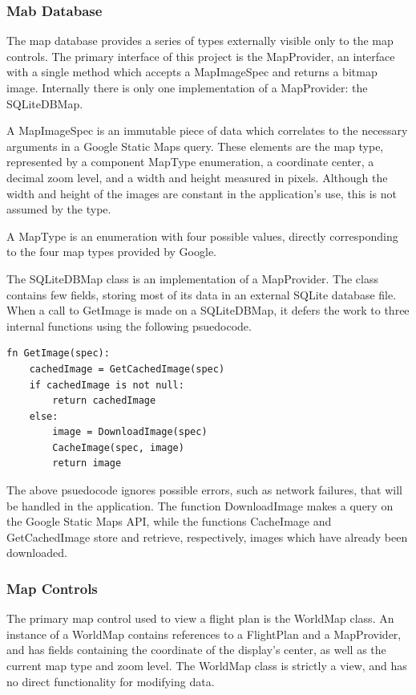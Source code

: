 \documentclass[12pt, letterpaper]{article}
\begin{document}
\newpage
\subsubsection{Mab Database}\label{sec:mapdB}
The map database provides a series of types externally visible only to the map controls.
The primary interface of this project is the MapProvider, an interface with a single method which accepts a MapImageSpec and returns a bitmap image.
Internally there is only one implementation of a MapProvider: the SQLiteDBMap.


A MapImageSpec is an immutable piece of data which correlates to the necessary arguments in a Google Static Maps query.
These elements are the map type, represented by a component MapType enumeration, a coordinate center, a decimal zoom level, and a width and height measured in pixels.
Although the width and height of the images are constant in the application's use, this is not assumed by the type.

A MapType is an enumeration with four possible values, directly corresponding to the four map types provided by Google.

The SQLiteDBMap class is an implementation of a MapProvider.
The class contains few fields, storing most of its data in an external SQLite database file.
When a call to GetImage is made on a SQLiteDBMap, it defers the work to three internal functions using the following psuedocode.

\begin{lstlisting}
fn GetImage(spec):
    cachedImage = GetCachedImage(spec)
    if cachedImage is not null:
        return cachedImage
    else:
        image = DownloadImage(spec)
        CacheImage(spec, image)
        return image
\end{lstlisting}

The above psuedocode ignores possible errors, such as network failures, that will be handled in the application.
The function DownloadImage makes a query on the Google Static Maps API,
while the functions CacheImage and GetCachedImage store and retrieve, respectively, images which have already been downloaded.

\subsubsection{Map Controls}\label{sec:map}
The primary map control used to view a flight plan is the WorldMap class.
An instance of a WorldMap contains references to a FlightPlan and a MapProvider,
and has fields containing the coordinate of the display's center, as well as the current map type and zoom level.
The WorldMap class is strictly a view, and has no direct functionality for modifying data.
\end{document}
